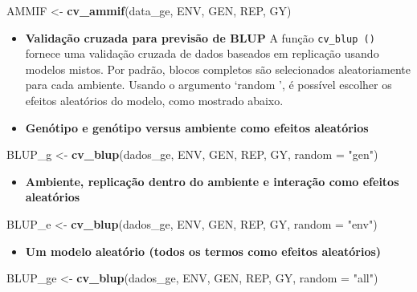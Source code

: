 \documentclass[
]{book}
\newenvironment{Shaded}{\begin{snugshade}}{\end{snugshade}}
\newcommand{\DataTypeTok}[1]{\textcolor[rgb]{0.13,0.29,0.53}{#1}}
\newcommand{\KeywordTok}[1]{\textcolor[rgb]{0.13,0.29,0.53}{\textbf{#1}}}
\newcommand{\NormalTok}[1]{#1}
\newcommand{\StringTok}[1]{\textcolor[rgb]{0.31,0.60,0.02}{#1}}
\providecommand{\tightlist}{%
  \setlength{\itemsep}{0pt}\setlength{\parskip}{0pt}}
\numberwithin{equation}{section}
\begin{document}
\begin{Shaded}
\begin{Highlighting}[]
\NormalTok{AMMIF \textless{}{-}}\StringTok{ }\KeywordTok{cv\_ammif}\NormalTok{(data\_ge, ENV, GEN, REP, GY)}
\end{Highlighting}
\end{Shaded}

\begin{itemize}
\item
  \textbf{Validação cruzada para previsão de BLUP}
  A função \texttt{cv\_blup\ ()} fornece uma validação cruzada de dados baseados em replicação usando modelos mistos. Por padrão, blocos completos são selecionados aleatoriamente para cada ambiente. Usando o argumento `random ', é possível escolher os efeitos aleatórios do modelo, como mostrado abaixo.
\item
  \textbf{Genótipo e genótipo versus ambiente como efeitos aleatórios}
\end{itemize}

\begin{Shaded}
\begin{Highlighting}[]
\NormalTok{BLUP\_g \textless{}{-}}\StringTok{ }\KeywordTok{cv\_blup}\NormalTok{(dados\_ge, ENV, GEN, REP, GY, }\DataTypeTok{random =} \StringTok{"gen"}\NormalTok{)}
\end{Highlighting}
\end{Shaded}

\begin{itemize}
\tightlist
\item
  \textbf{Ambiente, replicação dentro do ambiente e interação como efeitos aleatórios}
\end{itemize}

\begin{Shaded}
\begin{Highlighting}[]
\NormalTok{BLUP\_e \textless{}{-}}\StringTok{ }\KeywordTok{cv\_blup}\NormalTok{(dados\_ge, ENV, GEN, REP, GY, }\DataTypeTok{random =} \StringTok{"env"}\NormalTok{)}
\end{Highlighting}
\end{Shaded}

\begin{itemize}
\tightlist
\item
  \textbf{Um modelo aleatório (todos os termos como efeitos aleatórios)}
\end{itemize}

\begin{Shaded}
\begin{Highlighting}[]
\NormalTok{BLUP\_ge \textless{}{-}}\StringTok{ }\KeywordTok{cv\_blup}\NormalTok{(dados\_ge, ENV, GEN, REP, GY, }\DataTypeTok{random =} \StringTok{"all"}\NormalTok{)}
\end{Highlighting}
\end{Shaded}
\end{document}
